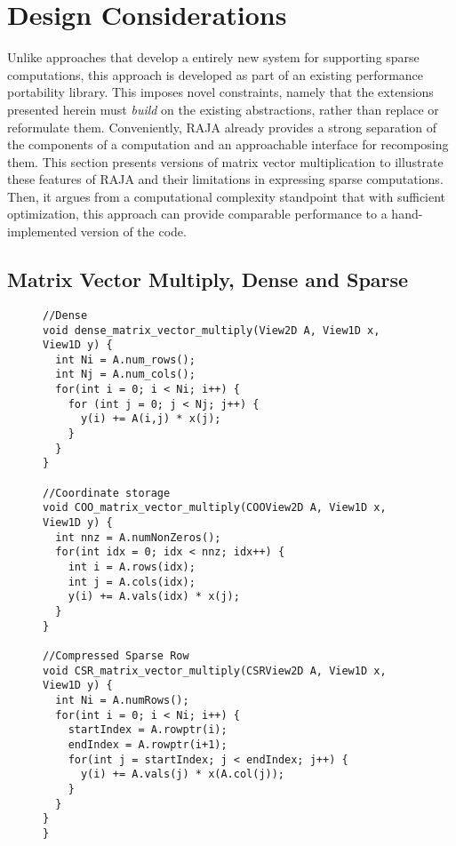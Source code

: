 \section{Design Considerations}

Unlike approaches that develop a entirely new system for supporting sparse computations, this approach is developed as part of an existing performance portability library.
This imposes novel constraints, namely that the extensions presented herein must \textit{build} on the existing abstractions, rather than replace or reformulate them.
Conveniently, RAJA already provides a strong separation of the components of a computation and an approachable interface for recomposing them.
This section presents versions of matrix vector multiplication to illustrate these features of RAJA and their limitations in expressing sparse computations.
Then, it argues from a computational complexity standpoint that with sufficient optimization, this approach can provide comparable performance to a hand-implemented version of the code.

\subsection{Matrix Vector Multiply, Dense and Sparse}
\begin{figure}
\begin{lstlisting}[caption={Matrix vector multiply routines for matrices in different formats.},label=DenseAndSparseMV]  
//Dense
void dense_matrix_vector_multiply(View2D A, View1D x, View1D y) {
  int Ni = A.num_rows();
  int Nj = A.num_cols();
  for(int i = 0; i < Ni; i++) {
    for (int j = 0; j < Nj; j++) {
      y(i) += A(i,j) * x(j);
    }
  }
}

//Coordinate storage
void COO_matrix_vector_multiply(COOView2D A, View1D x, View1D y) {
  int nnz = A.numNonZeros();
  for(int idx = 0; idx < nnz; idx++) {
    int i = A.rows(idx);
    int j = A.cols(idx);
    y(i) += A.vals(idx) * x(j);
  }
}

//Compressed Sparse Row
void CSR_matrix_vector_multiply(CSRView2D A, View1D x, View1D y) {
  int Ni = A.numRows();
  for(int i = 0; i < Ni; i++) {
    startIndex = A.rowptr(i);
    endIndex = A.rowptr(i+1);
    for(int j = startIndex; j < endIndex; j++) {
      y(i) += A.vals(j) * x(A.col(j));
    }
  }
}
}
\end{lstlisting}
\end{figure}

